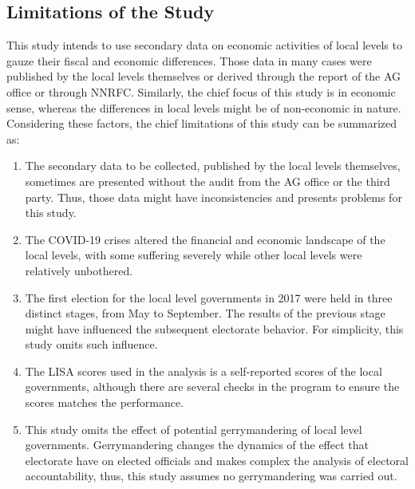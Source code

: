 \subsection{Limitations of the Study}
This study intends to use secondary data on economic activities of local levels to gauze their fiscal and economic differences. Those data in many cases were published by the local levels themselves or derived through the report of the AG office or through NNRFC. Similarly, the chief focus of this study is in economic sense, whereas the differences in local levels might be of non-economic in nature. Considering these factors, the chief limitations of this study can be summarized as:
\begin{enumerate}[label=\roman*.]
	\item The secondary data to be collected, published by the local levels themselves, sometimes are presented without the audit from the AG office or the third party. Thus, those data might have inconsistencies and presents problems for this study.
	\item The COVID-19 crises altered the financial and economic landscape of the local levels, with some suffering severely while other local levels were relatively unbothered.
	\item The first election for the local level governments in 2017 were held in three distinct stages, from May to September. The results of the previous stage might have influenced the subsequent electorate behavior. For simplicity, this study omits such influence.
	\item The LISA scores used in the analysis is a self-reported scores of the local governments, although there are several checks in the program to ensure the scores matches the performance. 
	\item This study omits the effect of potential gerrymandering of local level governments. Gerrymandering changes the dynamics of the effect that electorate have on elected officials and makes complex the analysis of electoral accountability, thus, this study assumes no gerrymandering was carried out. 
\end{enumerate}
